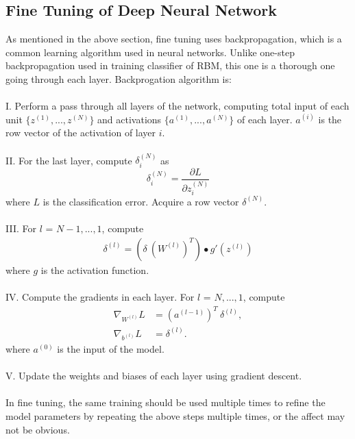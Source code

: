 \documentclass[12pt]{article}
\begin{document}
\subsection{Fine Tuning of Deep Neural Network}
As mentioned in the above section, fine tuning uses backpropagation, which is a common learning algorithm used in neural networks. Unlike one-step backpropagation used in training classifier of RBM, this one is a thorough one going through each layer. Backprogation algorithm is:\\
\\
I. Perform a pass through all layers of the network, computing total input of each unit $\{z^{(1)},..., z^{(N)}\}$ and activations $\{a^{(1)},..., a^{(N)}\}$ of each layer. $a^{(i)}$ is the row vector of the activation of layer $i$. \\
\\
II. For the last layer, compute $\delta_i^{(N)}$ as
\begin{equation}
\delta_i^{(N)} = \frac{\partial L}{\partial z^{(N)}_i}
\end{equation}
where $L$ is the classification error. Acquire a row vector $\delta^{(N)}$. \\
\\
III. For $l$ = $N-1, ...,1$, compute 
\begin{align}
\delta^{(l)} = \left(\delta ~ (W^{(l)})^T \right) \bullet g'(z^{(l)})
\end{align}
where $g$ is the activation function.\\
\\
IV. Compute the gradients in each layer. For $l$ = $N, ..., 1$, compute 
\begin{align}
\nabla_{W^{(l)}} L &= (a^{(l-1)})^T~\delta^{(l)}, \\
\nabla_{b^{(l)}} L &= \delta^{(l)}.
\end{align}
where $a^{(0)}$ is the input of the model.\\
\\
V. Update the weights and biases of each layer using gradient descent.\\
\\
In fine tuning, the same training should be used multiple times to refine the model parameters by repeating the above steps multiple times, or the affect may not be obvious.
\end{document}
